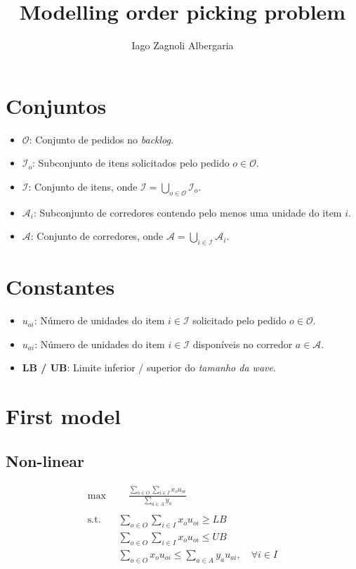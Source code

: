 \documentclass[12pt]{article}
\title{Modelling order picking problem}
\author{Iago Zagnoli Albergaria}
\begin{document}
\maketitle

\section{Conjuntos}

\begin{itemize}
    \item $\mathcal{O}$: Conjunto de pedidos no \textit{backlog}.
    \item $\mathcal{I}_o$: Subconjunto de itens solicitados pelo pedido $o \in \mathcal{O}$.
    \item $\mathcal{I}$: Conjunto de itens, onde $\mathcal{I} = \bigcup_{o \in \mathcal{O}} \mathcal{I}_o$.
    \item $\mathcal{A}_i$: Subconjunto de corredores contendo pelo menos uma unidade do item $i$.
    \item $\mathcal{A}$: Conjunto de corredores, onde $\mathcal{A} = \bigcup_{i \in \mathcal{I}} \mathcal{A}_i$.
\end{itemize}

\section{Constantes}

\begin{itemize}
    \item $u_{oi}$: Número de unidades do item $i \in \mathcal{I}$ solicitado pelo pedido $o \in \mathcal{O}$.
    \item $u_{ai}$: Número de unidades do item $i \in \mathcal{I}$ disponíveis no corredor $a \in \mathcal{A}$.
    \item \textbf{LB / UB}: Limite inferior / superior do \textit{tamanho da wave}.
\end{itemize}


\section{First model}
\subsection{Non-linear}

\begin{align*}
    \max &\quad \frac{\sum_{o \in O} \sum_{i \in I} x_o u_{oi}}{\sum_{a \in A} y_a} \\ \\
    \text{s.t.} \quad & \sum_{o \in O} \sum_{i \in I} x_o u_{oi} \geq LB \\
    & \sum_{o \in O} \sum_{i \in I} x_o u_{oi} \leq UB \\
    & \sum_{o \in O} x_o u_{oi} \leq \sum_{a \in A} y_a u_{ai}, \quad \forall i \in I
\end{align*}
\end{document}
